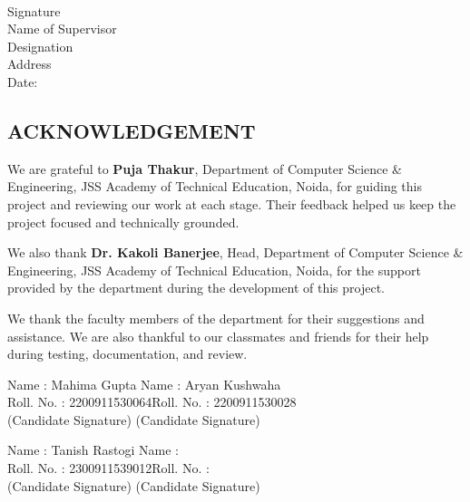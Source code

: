 \vspace{15 mm}
\\
\begin{flushleft}

Signature\\
\vspace{10 mm}
Name of Supervisor\\
Designation\\
Address\\
\vspace{10mm}
Date:
\end{flushleft}
\restoregeometry
\newpage

\begin{center}
 \chapter*{\size \textbf{ACKNOWLEDGEMENT}}
\end{center}
\newline
We are grateful to \textbf{Puja Thakur}, Department of Computer Science \& Engineering, JSS Academy of Technical Education, Noida, for guiding this project and reviewing our work at each stage. Their feedback helped us keep the project focused and technically grounded.

We also thank \textbf{Dr. Kakoli Banerjee}, Head, Department of Computer Science \& Engineering, JSS Academy of Technical Education, Noida, for the support provided by the department during the development of this project.

We thank the faculty members of the department for their suggestions and assistance. We are also thankful to our classmates and friends for their help during testing, documentation, and review.\\
\begin{flushright}
Name : Mahima Gupta \hfill Name : Aryan Kushwaha\\
Roll. No. : 2200911530064\hfill Roll. No. :   2200911530028\\
\vspace{5mm}
(Candidate Signature) \hfill (Candidate Signature) \\
\vspace{5mm}

Name : Tanish Rastogi \hfill Name : \\
Roll. No. : 2300911539012\hfill Roll. No. :   \\
\vspace{5mm}
(Candidate Signature) \hfill (Candidate Signature) \\
\vspace{5mm}

\end{flushright}
\newpage

\restoregeometry
\\